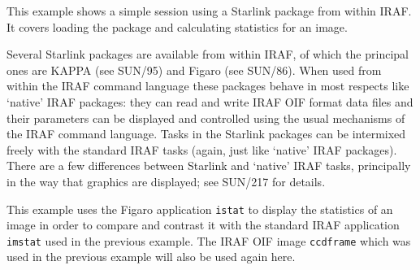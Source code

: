 \documentclass[twoside,11pt]{article}
\newcommand{\xref}[3]{#1}
\begin{document}
This example shows a simple session using a Starlink package from
within IRAF.  It covers loading the package and calculating statistics
for an image.

Several Starlink packages are available from within IRAF, of which the
principal ones are KAPPA (see \xref{SUN/95}{sun95}{}\cite{SUN95}) and
Figaro (see \xref{SUN/86}{sun86}{}\cite{SUN86}).  When used from within
the IRAF command language these packages behave in most respects like
`native' IRAF packages: they can read and write IRAF OIF format data
files and their parameters can be displayed and controlled using the
usual mechanisms of the IRAF command language.  Tasks in the Starlink
packages can be intermixed freely with the standard IRAF tasks (again,
just like `native' IRAF packages).  There are a few differences between
Starlink and `native' IRAF tasks, principally in the way that graphics are
displayed; see \xref{SUN/217}{sun217}{}\cite{SUN217} for details.

This example uses the Figaro application {\tt istat} to display the
statistics of an image in order to compare and contrast it with the
standard IRAF application {\tt imstat} used in the previous example.
The IRAF OIF image {\tt ccdframe} which was used in the previous
example will also be used again here.
\end{document}
